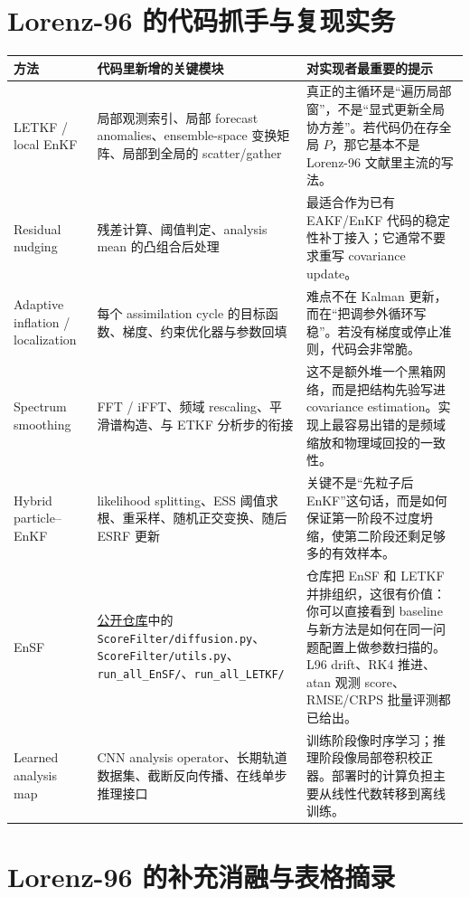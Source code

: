 \documentclass[12pt,a4paper]{ctexart}
\begin{document}
\section{Lorenz-96 的代码抓手与复现实务}\label{app:lorenz-code}

\begin{longtable}{>{\raggedright\arraybackslash}p{3.1cm} >{\raggedright\arraybackslash}p{3.8cm} >{\raggedright\arraybackslash}p{6.5cm}}
\toprule
方法 & 代码里新增的关键模块 & 对实现者最重要的提示 \\
\midrule
\endhead
LETKF / local EnKF & 局部观测索引、局部 forecast anomalies、ensemble-space 变换矩阵、局部到全局的 scatter/gather & 真正的主循环是“遍历局部窗”，不是“显式更新全局协方差”。若代码仍在存全局 \(P\)，那它基本不是 Lorenz-96 文献里主流的写法。 \\
Residual nudging & 残差计算、阈值判定、analysis mean 的凸组合后处理 & 最适合作为已有 EAKF/EnKF 代码的稳定性补丁接入；它通常不要求重写 covariance update。 \\
Adaptive inflation / localization & 每个 assimilation cycle 的目标函数、梯度、约束优化器与参数回填 & 难点不在 Kalman 更新，而在“把调参外循环写稳”。若没有梯度或停止准则，代码会非常脆。 \\
Spectrum smoothing & FFT / iFFT、频域 rescaling、平滑谱构造、与 ETKF 分析步的衔接 & 这不是额外堆一个黑箱网络，而是把结构先验写进 covariance estimation。实现上最容易出错的是频域缩放和物理域回投的一致性。 \\
Hybrid particle--EnKF & likelihood splitting、ESS 阈值求根、重采样、随机正交变换、随后 ESRF 更新 & 关键不是“先粒子后 EnKF”这句话，而是如何保证第一阶段不过度坍缩，使第二阶段还剩足够多的有效样本。 \\
EnSF & \href{https://github.com/zezhongzhang/EnSF}{公开仓库}中的 \texttt{ScoreFilter/diffusion.py}、\texttt{ScoreFilter/utils.py}、\texttt{run\_all\_EnSF/}、\texttt{run\_all\_LETKF/} & 仓库把 EnSF 和 LETKF 并排组织，这很有价值：你可以直接看到 baseline 与新方法是如何在同一问题配置上做参数扫描的。L96 drift、RK4 推进、atan 观测 score、RMSE/CRPS 批量评测都已给出。 \\
Learned analysis map & CNN analysis operator、长期轨道数据集、截断反向传播、在线单步推理接口 & 训练阶段像时序学习；推理阶段像局部卷积校正器。部署时的计算负担主要从线性代数转移到离线训练。 \\
\bottomrule
\end{longtable}

\section{Lorenz-96 的补充消融与表格摘录}\label{app:lorenz-results}
\end{document}
